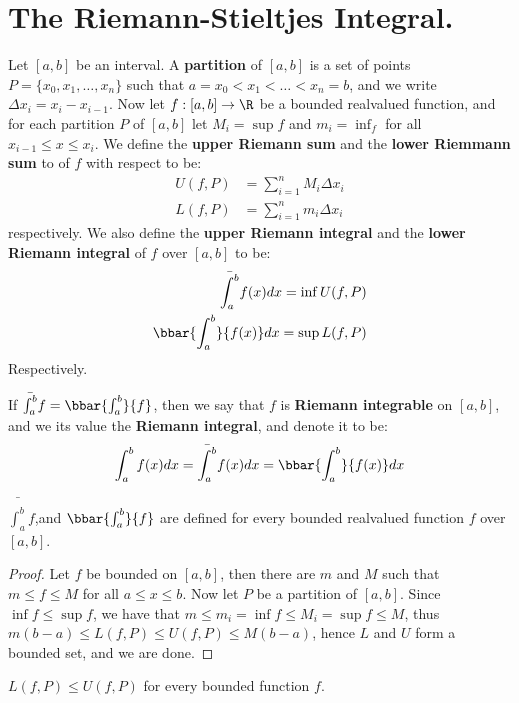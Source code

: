 
\section{The Riemann-Stieltjes Integral.}

\begin{definition}
    Let $[a,b]$ be an interval. A \textbf{partition} of $[a,b]$ is a set of
    points  $P=\{x_0,x_1, \dots, x_n\}$ such that $a=x_0<x_1< \dots <x_n=b$, and
    we write $\Delta{x_i}=x_i-x_{i-1}$. Now let  $f:[a,b] \rightarrow \R$ be a bounded 
    realvalued function, and for each partition $P$ of  $[a,b]$ let
    $M_i=\sup{f}$ and  $m_i=\inf_{f}$ for all  $x_{i-1} \leq x \leq x_i$. We
    define the \textbf{upper Riemann sum} and the \textbf{lower Riemmann sum} to
    of  $f$ with respect to be:
       \begin{align}
           U(f,P) &= \sum_{i=1}^{n}{M_i\Delta{x_i}} \\
           L(f,P) &= \sum_{i=1}^{n}{m_i\Delta{x_i}}
       \end{align}   
    respectively. We also define the \textbf{upper Riemann integral} and the
    \textbf{lower Riemann integral} of $f$ over  $[a,b]$ to be: 
       \begin{align}
           \bar{\int_{a}^{b}}{f(x)}dx=\inf{U(f,P)} \\
           \bbar{\int_{a}^{b}}{f(x)}dx=\sup{L(f,P)}
       \end{align}
    Respectively.
    
    If $\bar{\int_{a}^{b}}{f}=\bbar{\int_{a}^{b}}{f}$, then we say that  $f$ is
    \textbf{Riemann integrable} on  $[a,b]$, and we its value the
    \textbf{Riemann integral}, and denote it to be: 
        \begin{equation}
            \int_{a}^{b}{f(x)}dx=\bar{\int_{a}^{b}}{f(x)}dx=\bbar{\int_{a}^{b}}{f(x)}dx
        \end{equation} 
\end{definition}

\begin{lemma}\label{7.1.1}
    $\bar{\int_{a}^{b}}{f}$,and  $\bbar{\int_{a}^{b}}{f}$ are defined for every
    bounded realvalued function $f$ over  $[a,b]$.
\end{lemma}
\begin{proof}
    Let $f$ be bounded on  $[a,b]$, then there are  $m$ and  $M$ such that  $m
    \leq f \leq M$ for all  $a \leq x \leq b$. Now let  $P$ be a partition of
    $[a,b]$. Since  $\inf{f} \leq \sup{f}$, we have that $m \leq m_i=\inf{f}
    \leq M_i=\sup{f} \leq M$, thus  $m(b-a) \leq L(f,P) \leq U(f,P) \leq
    M(b-a)$, hence $L$ and  $U$ form a bounded set, and we are done.
\end{proof}
\begin{corollary}
    $L(f,P) \leq U(f,P )$ for every bounded function $f$.
\end{corollary}

